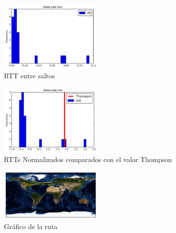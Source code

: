 \begin{figure}[H]
  \centering
    \includegraphics[width=0.45\textwidth]{histogramas_rtt/www-uae-ma.png}
  \caption{RTT entre saltos}
  \label{entropia-s}
\end{figure}

\begin{center}

\end{center}

\begin{figure}[H]
  \centering
    \includegraphics[width=0.45\textwidth]{histogramas_thompson/www-uae-ma.png}
  \caption{RTTs Normalizados comparados con el valor Thompson}
  \label{entropia-s}
\end{figure}

\begin{figure}[H]
  \centering
    \includegraphics[width=0.45\textwidth]{grafico-rutas/www-uae-ma.png}
  \caption{Gráfico de la ruta}
  \label{entropia-s}
\end{figure}




